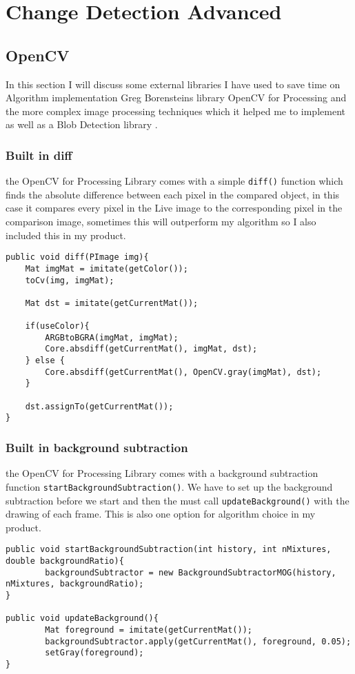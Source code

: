 \documentclass[a4paper]{report}
\begin{document}
\section{Change Detection Advanced}
\subsection{OpenCV}
In this section I will discuss some external libraries I have used to save time on Algorithm implementation Greg Borensteins library OpenCV for Processing \cite{OPENCV} and the more complex image processing techniques which it helped me to implement as well as a Blob Detection library \cite{BLOB}.

\subsubsection{Built in diff}
the OpenCV for Processing Library comes with a simple \verb|diff()| function which finds the absolute difference between each pixel in the compared object, in this case it compares every pixel in the Live image to the corresponding pixel in the comparison image, sometimes this will outperform my algorithm so I also included this in my product.

\begin{lstlisting}
public void diff(PImage img){
	Mat imgMat = imitate(getColor());
	toCv(img, imgMat);

	Mat dst = imitate(getCurrentMat());

	if(useColor){
		ARGBtoBGRA(imgMat, imgMat);
		Core.absdiff(getCurrentMat(), imgMat, dst);
	} else {
		Core.absdiff(getCurrentMat(), OpenCV.gray(imgMat), dst);
	}
		
	dst.assignTo(getCurrentMat());
}
\end{lstlisting}

\subsubsection{Built in background subtraction}
the OpenCV for Processing Library comes with a background subtraction function \verb|startBackgroundSubtraction()|. We have to set up the background subtraction before we start and then the must call \verb|updateBackground()| with the drawing of each frame. This is also one option for algorithm choice in my product.

\begin{lstlisting}
public void startBackgroundSubtraction(int history, int nMixtures, double backgroundRatio){
		backgroundSubtractor = new BackgroundSubtractorMOG(history, nMixtures, backgroundRatio);
}
	
public void updateBackground(){
		Mat foreground = imitate(getCurrentMat());
		backgroundSubtractor.apply(getCurrentMat(), foreground, 0.05);
		setGray(foreground);
}
\end{lstlisting}
\end{document}
